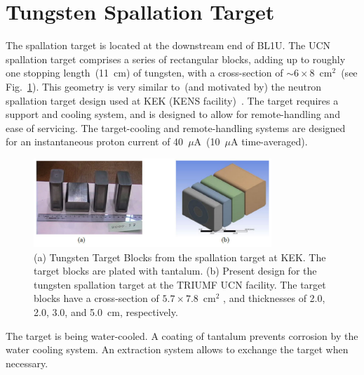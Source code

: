 \section{Tungsten Spallation Target\label{sec:target}}
The spallation target is located at the downstream end of BL1U. The
UCN spallation target comprises a series of rectangular blocks, adding
up to roughly one stopping length~(11~cm) of tungsten, with a
cross-section of $\sim6 \times 8$~cm$^2$~(see
Fig.~\ref{fig:target}). This geometry is very similar to~(and
motivated by) the neutron spallation target design used at KEK (KENS
facility)~\cite{kawai2001fabrication}. The target requires a support
and cooling system, and is designed to allow for remote-handling and
ease of servicing. The target-cooling and remote-handling systems are
designed for an instantaneous proton current of 40~$\mu$A~(10~$\mu$A
time-averaged).
\begin{figure}[h!]
  \centering
  \includegraphics[width=0.8\textwidth]{target.png}
  \caption{(a) Tungsten Target Blocks from the spallation target at
    KEK. The target blocks are plated with tantalum. (b) Present
    design for the tungsten spallation target at the TRIUMF UCN
    facility. The target blocks have a cross-section of
    $5.7 \times 7.8$~cm$^2$ , and thicknesses of 2.0, 2.0, 3.0, and
    5.0~cm, respectively.}
  \label{fig:target}
\end{figure}
The target is being water-cooled. A coating of tantalum prevents
corrosion by the water cooling system. An extraction system allows to
exchange the target when necessary.


